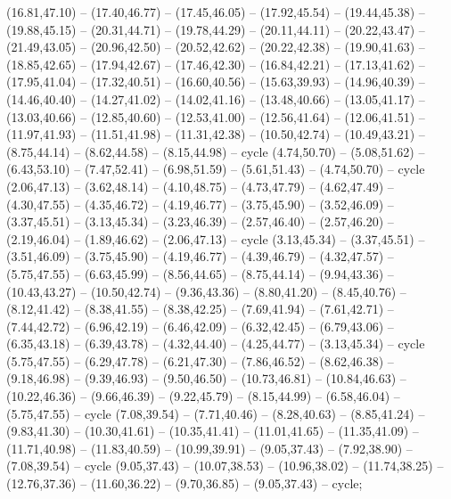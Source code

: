 {(16.81,47.10) -- (17.40,46.77) -- (17.45,46.05) -- (17.92,45.54) -- (19.44,45.38) -- (19.88,45.15) -- (20.31,44.71) -- (19.78,44.29) -- (20.11,44.11) -- (20.22,43.47) -- (21.49,43.05) -- (20.96,42.50) -- (20.52,42.62) -- (20.22,42.38) -- (19.90,41.63) -- (18.85,42.65) -- (17.94,42.67) -- (17.46,42.30) -- (16.84,42.21) -- (17.13,41.62) -- (17.95,41.04) -- (17.32,40.51) -- (16.60,40.56) -- (15.63,39.93) -- (14.96,40.39) -- (14.46,40.40) -- (14.27,41.02) -- (14.02,41.16) -- (13.48,40.66) -- (13.05,41.17) -- (13.03,40.66) -- (12.85,40.60) -- (12.53,41.00) -- (12.56,41.64) -- (12.06,41.51) -- (11.97,41.93) -- (11.51,41.98) -- (11.31,42.38) -- (10.50,42.74) -- (10.49,43.21) -- (8.75,44.14) -- (8.62,44.58) -- (8.15,44.98) -- cycle (4.74,50.70) -- (5.08,51.62) -- (6.43,53.10) -- (7.47,52.41) -- (6.98,51.59) -- (5.61,51.43) -- (4.74,50.70) -- cycle (2.06,47.13) -- (3.62,48.14) -- (4.10,48.75) -- (4.73,47.79) -- (4.62,47.49) -- (4.30,47.55) -- (4.35,46.72) -- (4.19,46.77) -- (3.75,45.90) -- (3.52,46.09) -- (3.37,45.51) -- (3.13,45.34) -- (3.23,46.39) -- (2.57,46.40) -- (2.57,46.20) -- (2.19,46.04) -- (1.89,46.62) -- (2.06,47.13) -- cycle (3.13,45.34) -- (3.37,45.51) -- (3.51,46.09) -- (3.75,45.90) -- (4.19,46.77) -- (4.39,46.79) -- (4.32,47.57) -- (5.75,47.55) -- (6.63,45.99) -- (8.56,44.65) -- (8.75,44.14) -- (9.94,43.36) -- (10.43,43.27) -- (10.50,42.74) -- (9.36,43.36) -- (8.80,41.20) -- (8.45,40.76) -- (8.12,41.42) -- (8.38,41.55) -- (8.38,42.25) -- (7.69,41.94) -- (7.61,42.71) -- (7.44,42.72) -- (6.96,42.19) -- (6.46,42.09) -- (6.32,42.45) -- (6.79,43.06) -- (6.35,43.18) -- (6.39,43.78) -- (4.32,44.40) -- (4.25,44.77) -- (3.13,45.34) -- cycle (5.75,47.55) -- (6.29,47.78) -- (6.21,47.30) -- (7.86,46.52) -- (8.62,46.38) -- (9.18,46.98) -- (9.39,46.93) -- (9.50,46.50) -- (10.73,46.81) -- (10.84,46.63) -- (10.22,46.36) -- (9.66,46.39) -- (9.22,45.79) -- (8.15,44.99) -- (6.58,46.04) -- (5.75,47.55) -- cycle (7.08,39.54) -- (7.71,40.46) -- (8.28,40.63) -- (8.85,41.24) -- (9.83,41.30) -- (10.30,41.61) -- (10.35,41.41) -- (11.01,41.65) -- (11.35,41.09) -- (11.71,40.98) -- (11.83,40.59) -- (10.99,39.91) -- (9.05,37.43) -- (7.92,38.90) -- (7.08,39.54) -- cycle (9.05,37.43) -- (10.07,38.53) -- (10.96,38.02) -- (11.74,38.25) -- (12.76,37.36) -- (11.60,36.22) -- (9.70,36.85) -- (9.05,37.43) -- cycle;
}
\newcommand{\countthreshold}{51 units, 0 below 2,000}
